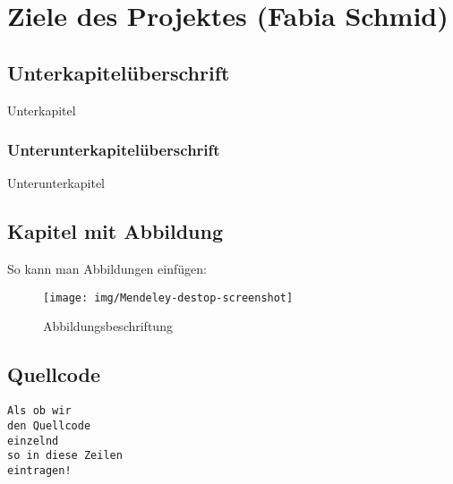 \section{Ziele des Projektes (Fabia Schmid)}

\label{instal}

\subsection{Unterkapitelüberschrift}

Unterkapitel

\subsubsection{Unterunterkapitelüberschrift}

Unterunterkapitel

\subsection{Kapitel mit Abbildung}

So kann man Abbildungen einfügen:

\begin{figure}[hbt]
\centering
\begin{minipage}[t]{1\textwidth} %
\caption{Abbildungsbeschriftung} %
\texttt{[image: img/Mendeley-destop-screenshot]}\\ %
\end{minipage}
\end{figure}

\subsection{Quellcode}

\texttt{Als ob wir}\\
\texttt{den Quellcode}\\
\texttt{einzelnd}\\
\texttt{so in diese Zeilen}\\
\texttt{eintragen!}\\
